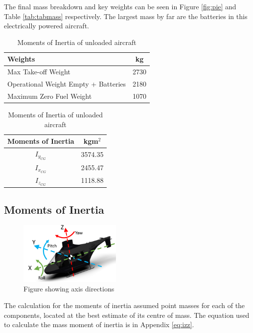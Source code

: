 \documentclass[11pt,a4paper]{article}
\begin{document}
The final mass breakdown and key weights can be seen in Figure \ref{fig:pie} and Table \ref{tab:tabmass} respectively. The largest mass by far are the batteries in this electrically powered aircraft.

\begin{table}[H]
	\begin{minipage}{0.5\linewidth}
	\caption{Key weights of aircraft}
		\label{tab:tabmass}
		\centering
\begin{tabular}{lc}
    \hline
    \rowcolor[HTML]{DAE8FC} 
    Weights       & kg   \\ \hline
    Max Take-off Weight          & 2730 \\ \hline
    Operational Weight Empty + Batteries & 2180 \\ \hline
    Maximum Zero Fuel Weight         & 1070 \\ \hline
\end{tabular}
	\end{minipage}\hfill
	\begin{minipage}{0.48\linewidth}
\centering
\caption{Moments of Inertia of unloaded aircraft}
		\label{tab:tabinertia}
\begin{tabular}{cc}
\hline
\rowcolor[HTML]{DAE8FC} 
Moments of Inertia & kgm$^2$   \\ \hline
$I_{y_{CG}}$        & 3574.35 \\ \hline
$I_{x_{CG}}$        & 2455.47 \\ \hline
$I_{z_{CG}}$        & 1118.88 \\ \hline
\end{tabular}

	\end{minipage}
\end{table}
\subsection{Moments of Inertia}

\begin{figure}
\begin{center}
    \includegraphics[width=5cm]{AXIS.PNG}
\end{center}
        \caption{Figure showing axis directions}
    \label{fig:axis}
\end{figure}
The calculation for the moments of inertia assumed point masses for each of the components, located at the best estimate of its centre of mass. The equation used to calculate the mass moment of inertia is in Appendix \ref{eq:izz}.
\end{document}
